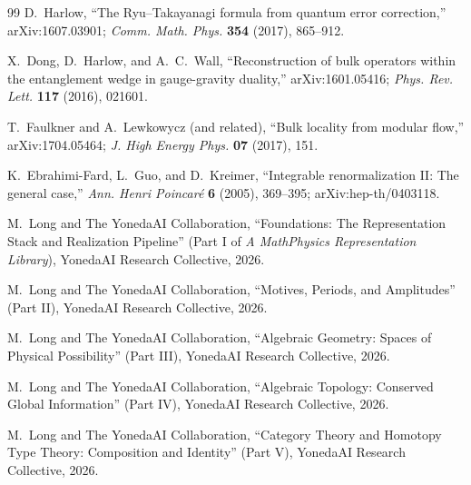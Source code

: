 \documentclass[12pt]{article}
\theoremstyle{definition}
\theoremstyle{remark}
\newcommand{\MtoP}{Math\textrightarrow{}Physics}
\begin{document}
\begin{thebibliography}{99}
D.~Harlow,
``The Ryu--Takayanagi formula from quantum error correction,''
arXiv:1607.03901;
\emph{Comm. Math. Phys.} \textbf{354} (2017), 865--912.

X.~Dong, D.~Harlow, and A.~C.~Wall,
``Reconstruction of bulk operators within the entanglement wedge in gauge-gravity
duality,''
arXiv:1601.05416;
\emph{Phys. Rev. Lett.} \textbf{117} (2016), 021601.

T.~Faulkner and A.~Lewkowycz (and related),
``Bulk locality from modular flow,''
arXiv:1704.05464;
\emph{J. High Energy Phys.} \textbf{07} (2017), 151.

K.~Ebrahimi-Fard, L.~Guo, and D.~Kreimer,
``Integrable renormalization II: The general case,''
\emph{Ann. Henri Poincar\'e} \textbf{6} (2005), 369--395;
arXiv:hep-th/0403118.

M.~Long and The YonedaAI Collaboration,
``Foundations: The Representation Stack and Realization Pipeline'' (Part I of
\emph{A \MtoP{} Representation Library}), YonedaAI Research Collective, 2026.

M.~Long and The YonedaAI Collaboration,
``Motives, Periods, and Amplitudes'' (Part II), YonedaAI Research Collective, 2026.

M.~Long and The YonedaAI Collaboration,
``Algebraic Geometry: Spaces of Physical Possibility'' (Part III), YonedaAI Research
Collective, 2026.

M.~Long and The YonedaAI Collaboration,
``Algebraic Topology: Conserved Global Information'' (Part IV), YonedaAI Research
Collective, 2026.

M.~Long and The YonedaAI Collaboration,
``Category Theory and Homotopy Type Theory: Composition and Identity'' (Part V),
YonedaAI Research Collective, 2026.

\end{thebibliography}
\end{document}

